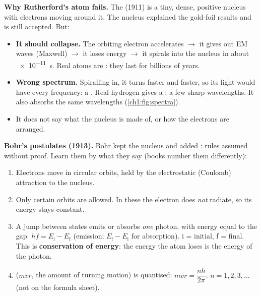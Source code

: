 \textbf{Why Rutherford's atom fails.} The  (1911) is a tiny,
dense, positive nucleus with electrons moving around it. The nucleus explained the gold-foil
results and is still accepted. But:
\begin{itemize}
  \item \textbf{It should collapse.} The orbiting electron accelerates $\to$ it gives out EM
        waves (Maxwell) $\to$ it loses energy $\to$ it spirals into the nucleus in about
        \qty{e-11}{s}. Real atoms are : they last for billions of years.
  \item \textbf{Wrong spectrum.} Spiralling in, it turns faster and faster, so its light would
        have every frequency: a . Real hydrogen gives a
        : a few sharp wavelengths. It also absorbs the same
        wavelengths (\cref{ch1:fig:spectra}).
  \item It does not say what the nucleus is made of, or how the electrons are arranged.
\end{itemize}

\textbf{Bohr's postulates (1913).} Bohr kept the nucleus and added : rules
assumed without proof. Learn them by what they say (books number them differently):
\begin{enumerate}
  \item Electrons move in circular orbits, held by the electrostatic (Coulomb) attraction to
        the nucleus.
  \item Only certain orbits are allowed. In these  the electron does
        \emph{not} radiate, so its energy stays constant.
  \item A jump between states emits or absorbs \emph{one} photon, with energy equal to the gap:
        $hf = E_\mathrm{i} - E_\mathrm{f}$ (emission; $E_\mathrm{f} - E_\mathrm{i}$ for
        absorption). i = initial, f = final. This is \textbf{conservation of energy}: the
        energy the atom loses is the energy of the photon.
  \item {} ($mvr$, the amount of turning motion) is quantised:
        $mvr = \dfrac{nh}{2\pi}$, $n = 1, 2, 3, \ldots$ (not on the formula sheet).
\end{enumerate}

